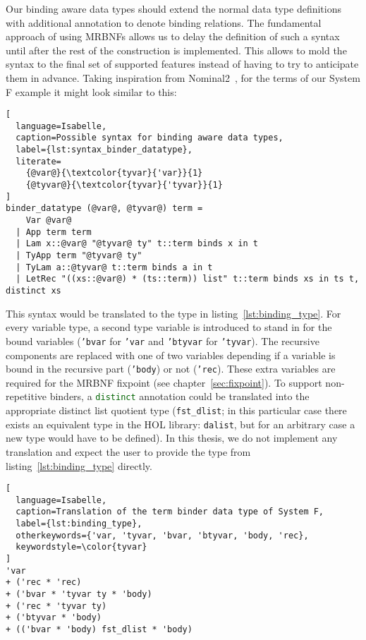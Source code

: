 Our binding aware data types should extend the normal data type definitions with additional annotation to denote binding relations. The fundamental approach of using \acp{MRBNF} allows us to delay the definition of such a syntax until after the rest of the construction is implemented. This allows to mold the syntax to the final set of supported features instead of having to try to anticipate them in advance. Taking inspiration from Nominal2~\cite{nominal2}, for the terms of our System F example it might look similar to this:

\begin{lstlisting}[
  language=Isabelle,
  caption=Possible syntax for binding aware data types,
  label={lst:syntax_binder_datatype},
  literate=
    {@var@}{\textcolor{tyvar}{'var}}{1}
    {@tyvar@}{\textcolor{tyvar}{'tyvar}}{1}
]
binder_datatype (@var@, @tyvar@) term =
    Var @var@
  | App term term
  | Lam x::@var@ "@tyvar@ ty" t::term binds x in t
  | TyApp term "@tyvar@ ty"
  | TyLam a::@tyvar@ t::term binds a in t
  | LetRec "((xs::@var@) * (ts::term)) list" t::term binds xs in ts t, distinct xs
\end{lstlisting}

This syntax would be translated to the type in listing~\ref{lst:binding_type}. For every variable type, a second type variable is introduced to stand in for the bound variables (\texttt{\textcolor{tyvar}{'bvar}} for \texttt{\textcolor{tyvar}{'var}} and \texttt{\textcolor{tyvar}{'btyvar}} for \texttt{\textcolor{tyvar}{'tyvar}}). The recursive components are replaced with one of two variables depending if a variable is bound in the recursive part (\texttt{\textcolor{tyvar}{'body}}) or not (\texttt{\textcolor{tyvar}{'rec}}). These extra variables are required for the \ac{MRBNF} fixpoint (see chapter~\ref{sec:fixpoint}). To support non-repetitive binders, a \texttt{\textcolor{darkgreen}{distinct}} annotation could be translated into the appropriate distinct list quotient type (\texttt{fst\_dlist}; in this particular case there exists an equivalent type in the \ac{HOL} library: \texttt{dalist}, but for an arbitrary case a new type would have to be defined). In this thesis, we do not implement any translation and expect the user to provide the type from listing~\ref{lst:binding_type} directly.

\begin{lstlisting}[
  language=Isabelle,
  caption=Translation of the term binder data type of System F,
  label={lst:binding_type},
  otherkeywords={'var, 'tyvar, 'bvar, 'btyvar, 'body, 'rec},
  keywordstyle=\color{tyvar}
]
'var
+ ('rec * 'rec)
+ ('bvar * 'tyvar ty * 'body)
+ ('rec * 'tyvar ty)
+ ('btyvar * 'body)
+ (('bvar * 'body) fst_dlist * 'body)
\end{lstlisting}

